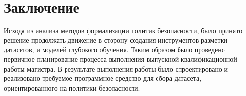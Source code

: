 \documentclass[../main]{subfiles}
\begin{document}
\newpage
{}
{}
\section*{Заключение}

Исходя из анализа методов формализации политик безопасности, было принято решение продолжать движение в сторону создания инструментов разметки датасетов, и моделей глубокого обучения. Таким образом было проведено первичное планирование процесса выполнения выпускной квалификационной работы магистра.
В результате выполнения работы было спроектировано и реализовано требуемое программное средство для сбора датасета, ориентированного на политики безопасности.
\end{document}
